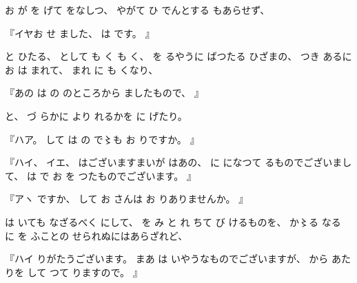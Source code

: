 
お
が
を
げて
をなしつ、
%
やがて
ひ
でんとする
もあらせず、

『イヤお
せ
ました、
%
は
です。
』

と
ひたる、
%
として
も
く
も
く、
%
を
るやうに
ばつたる
ひざまの、
%
つき
あるに
お
は
まれて、
%
まれ
に
も
くなり、

『あの
は
の
のところから
ましたもので、
』

と、
%
づ
らかに
より
れるかを
に
げたり。

『ハア。
%
して
は
の
で〻も
お
りですか。
』

『ハイ、
%
イエ、
%
はございますまいが
はあの、
%
に
になつて
るものでございまして、
%
は
で
お
を
つたものでございます。
』

『アヽ
ですか、
%
して
お
さんは
お
りありませんか。
』

は
いても
なざるべく
にして、
%
を
み
と
れ
ちて
び
けるものを、
%
か〻る
なる
に
を
ふことの
せられぬにはあらざれど、

『ハイ
りがたうございます。
%
まあ
は
いやうなものでございますが、
%
から
あたりを
して
つて
りますので。
』

